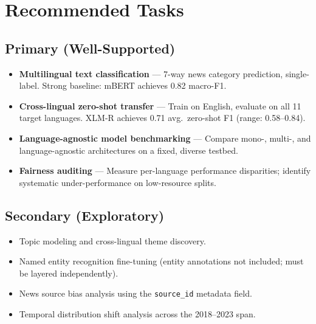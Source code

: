 \section{Recommended Tasks}

\subsection*{Primary (Well-Supported)}
\begin{itemize}[label={\textcolor{accent}{\faCheck}}]
  \item \textbf{Multilingual text classification} — 7-way news category prediction,
        single-label. Strong baseline: mBERT achieves 0.82 macro-F1.
  \item \textbf{Cross-lingual zero-shot transfer} — Train on English, evaluate on all 11
        target languages. XLM-R achieves 0.71 avg.\ zero-shot F1 (range: 0.58--0.84).
  \item \textbf{Language-agnostic model benchmarking} — Compare mono-, multi-, and
        language-agnostic architectures on a fixed, diverse testbed.
  \item \textbf{Fairness auditing} — Measure per-language performance disparities;
        identify systematic under-performance on low-resource splits.
\end{itemize}

\subsection*{Secondary (Exploratory)}
\begin{itemize}[label={\textcolor{midgray}{\faCircle[regular]}}]
  \item Topic modeling and cross-lingual theme discovery.
  \item Named entity recognition fine-tuning (entity annotations not included; must be
        layered independently).
  \item News source bias analysis using the \texttt{source\_id} metadata field.
  \item Temporal distribution shift analysis across the 2018--2023 span.
\end{itemize}

